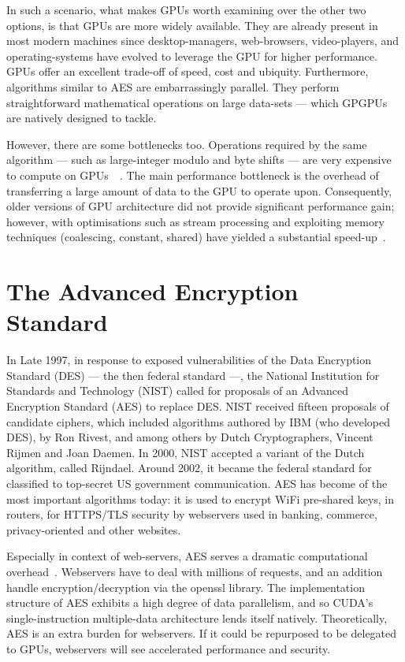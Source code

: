 \documentclass[letterpaper,twocolumn,10pt]{article}
\begin{document}
In such a scenario, what makes GPUs worth examining over the other two options, is that GPUs are more widely available.
They are already present in most modern machines since desktop-managers, web-browsers, video-players, and operating-systems have evolved to leverage the GPU for higher performance.
GPUs offer an excellent trade-off of speed, cost and ubiquity.
Furthermore, algorithms similar to AES are embarrassingly parallel. They perform straightforward mathematical operations on large data-sets --- which GPGPUs are natively designed to tackle.

However, there are some bottlenecks too.
Operations required by the same algorithm --- such as large-integer modulo and byte shifts --- are very expensive to compute on GPUs~\cite{cuda_pro_guide}~\cite{modulo_error}.
The main performance bottleneck is the overhead of transferring a large amount of data to the GPU to operate upon.
Consequently, older versions of GPU architecture did not provide significant performance gain; however, with optimisations such as stream processing and exploiting memory techniques (coalescing, constant, shared) have yielded a substantial speed-up~\cite{iwai}.

\section{The Advanced Encryption Standard}
In Late 1997, in response to exposed vulnerabilities of the Data Encryption Standard (DES) --- the then federal standard ---, the National Institution for Standards and Technology (NIST) called for proposals of an Advanced Encryption Standard (AES) to replace DES.
NIST received fifteen proposals of candidate ciphers, which included algorithms authored by IBM (who developed DES), by Ron Rivest, and among others by Dutch Cryptographers, Vincent Rijmen and Joan Daemen.
In 2000, NIST accepted a variant of the Dutch algorithm, called Rijndael.
Around 2002, it became the federal standard for classified to top-secret US government communication.
AES has become of the most important algorithms today: it is used to encrypt WiFi pre-shared keys, in routers, for HTTPS/TLS security by webservers used in banking, commerce, privacy-oriented and other websites.

Especially in context of web-servers, AES serves a dramatic computational overhead~\cite{ieee_cuda}. Webservers have to deal with millions of requests, and an addition handle encryption/decryption via the openssl library.
The implementation structure of AES exhibits a high degree of data parallelism, and so CUDA's single-instruction multiple-data architecture lends itself natively.
Theoretically, AES is an extra burden for webservers. 
If it could be repurposed to be delegated to GPUs, webservers will see accelerated performance and security.
\end{document}
